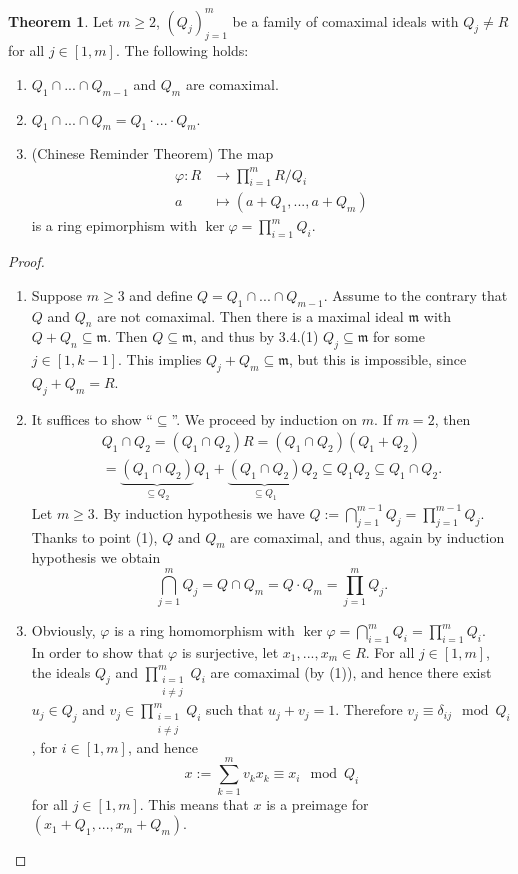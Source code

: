 \documentclass[12pt,a4paper]{report}
\theoremstyle{definition}
\newtheorem{theorem}{Theorem}[chapter] %
\theoremstyle{num.custom-title}
\DeclareMathOperator{\sse}{\subseteq}
\newcommand{\m}{\mathfrak{m}}
\renewcommand{\phi}{\varphi}
\begin{document}
\begin{theorem}
Let $m \geq 2$, $(Q_j)_{j=1}^m$ be a family of comaximal ideals with $Q_j \neq R$ for all $j \in [1,m]$. The following holds:
\begin{enumerate}
\item $Q_1 \cap ... \cap Q_{m-1}$ and $Q_m$ are comaximal.
\item $Q_1 \cap ... \cap Q_m = Q_1 \cdot ... \cdot Q_m$.
\item (Chinese Reminder Theorem) The map
\begin{align*}
  \phi \colon R &\to \prod_{i=1}^m R/Q_i\\
   a &\mapsto (a+Q_1,...,a+Q_m)
\end{align*}
is a ring epimorphism with $\ker \phi = \prod_{i=1}^m Q_i$.
\end{enumerate}
\begin{proof}\ 
\begin{enumerate}
\item Suppose $m \geq 3$ and define $Q=Q_1 \cap ... \cap Q_{m-1}$. Assume to the contrary that $Q$ and $Q_n$ are not comaximal. Then there is a maximal ideal $\m$ with $Q+Q_n \sse \m$. Then $Q \sse \m$, and thus by 3.4.(1) $Q_j \sse \m$ for some $j \in [1,k-1]$. This implies $Q_j+Q_m \sse \m$, but this is impossible, since $Q_j+Q_m=R$.
\item It suffices to show ``$\sse$''. We proceed by induction on $m$. If $m=2$, then 
\begin{multline*}
Q_1 \cap Q_2 = (Q_1 \cap Q_2) R = (Q_1 \cap Q_2) (Q_1+Q_2) \\ = \underbrace{(Q_1 \cap Q_2)}_{\sse Q_2} Q_1 + \underbrace{(Q_1 \cap Q_2)}_{\sse Q_1} Q_2 \sse Q_1Q_2 \sse Q_1 \cap Q_2.
\end{multline*}
Let $m \geq 3$. By induction hypothesis we have $Q:= \bigcap_{j=1}^{m-1} Q_j = \prod_{j=1}^{m-1} Q_j$. Thanks to point (1), $Q$ and $Q_m$ are comaximal, and thus, again by induction hypothesis we obtain
\[
\bigcap_{j=1}^m Q_j = Q \cap Q_m = Q \cdot Q_m = \prod_{j=1}^m Q_j.
\]
\item Obviously, $\phi$ is a ring homomorphism with $\ker \phi = \bigcap_{i=1}^m Q_i = \prod_{i=1}^m Q_i$.\\
In order to show that $\phi$ is surjective, let $x_1,...,x_m \in R$. For all $j \in [1,m]$, the ideals $Q_j$ and $\prod_{\substack{i=1\\ i \neq j}}^m Q_i$ are comaximal (by (1)), and hence there exist $u_j \in Q_j$ and $v_j \in \prod_{\substack{i=1\\ i \neq j}}^m Q_i$ such that $u_j+v_j=1$. Therefore $v_j \equiv \delta_{ij} \mod Q_i$, for $i \in [1,m]$, and hence 
\[
x:= \sum_{k=1}^m v_k x_k \equiv x_i \mod Q_i
\]
for all $j \in [1,m]$. This means that $x$ is a preimage for $(x_1+Q_1,...,x_m+Q_m)$.
\end{enumerate}
\end{proof}
\end{theorem}
\end{document}
